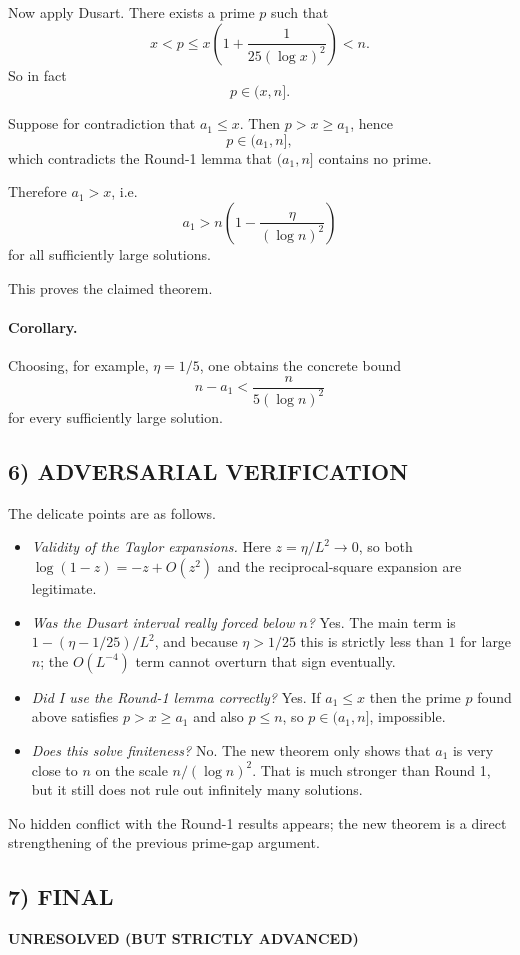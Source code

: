 Now apply Dusart. There exists a prime $p$ such that
\[
x<p\leq x\left(1+\frac{1}{25(\log x)^{2}}\right)<n.
\]
So in fact
\[
p\in (x,n].
\]

Suppose for contradiction that $a_{1}\leq x$. Then $p>x\geq a_{1}$, hence
\[
p\in (a_{1},n],
\]
which contradicts the Round-1 lemma that $(a_{1},n]$ contains no prime.

Therefore $a_{1}>x$, i.e.
\[
a_{1}>n\left(1-\frac{\eta}{(\log n)^{2}}\right)
\]
for all sufficiently large solutions.

This proves the claimed theorem.

\paragraph{Corollary.}
Choosing, for example, $\eta=1/5$, one obtains the concrete bound
\[
n-a_{1}<\frac{n}{5(\log n)^{2}}
\]
for every sufficiently large solution.

\subsection*{6) ADVERSARIAL VERIFICATION}
The delicate points are as follows.
\begin{itemize}
\item \emph{Validity of the Taylor expansions.} Here $z=\eta/L^{2}\to 0$, so both $\log(1-z)=-z+O(z^{2})$ and the reciprocal-square expansion are legitimate.
\item \emph{Was the Dusart interval really forced below $n$?} Yes. The main term is $1-(\eta-1/25)/L^{2}$, and because $\eta>1/25$ this is strictly less than $1$ for large $n$; the $O(L^{-4})$ term cannot overturn that sign eventually.
\item \emph{Did I use the Round-1 lemma correctly?} Yes. If $a_{1}\leq x$ then the prime $p$ found above satisfies $p>x\geq a_{1}$ and also $p\leq n$, so $p\in (a_{1},n]$, impossible.
\item \emph{Does this solve finiteness?} No. The new theorem only shows that $a_{1}$ is very close to $n$ on the scale $n/(\log n)^{2}$. That is much stronger than Round 1, but it still does not rule out infinitely many solutions.
\end{itemize}
No hidden conflict with the Round-1 results appears; the new theorem is a direct strengthening of the previous prime-gap argument.

\subsection*{7) FINAL}
\textbf{UNRESOLVED (BUT STRICTLY ADVANCED)}

